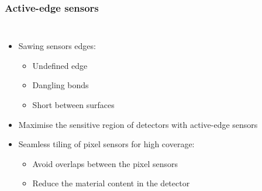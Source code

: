 \begin{frame}
  \frametitle{Active-edge sensors}

  \begin{columns}

    \begin{itemize}
    \item Sawing sensors edges:
      \begin{itemize}
      \item Undefined edge
      \item Dangling bonds
      \item Short between surfaces
      \end{itemize}
    \item Maximise the sensitive region of detectors with active-edge
      sensors
    \item Seamless tiling of pixel sensors for high coverage:
      \begin{itemize}
      \item Avoid overlaps between the pixel sensors
      \item Reduce the material content in the detector
      \end{itemize}
    \end{itemize}

    \vspace{-0.8cm}
\end{columns}
\end{frame}
